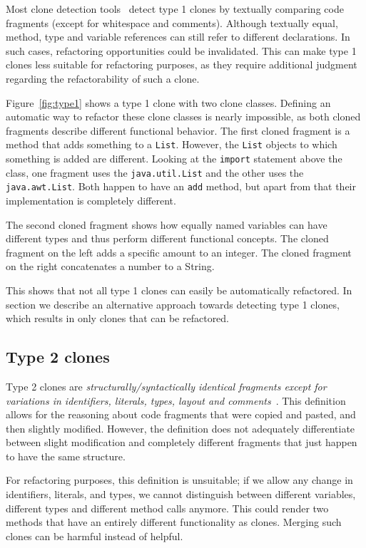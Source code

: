 Most clone detection tools~\cite{kamiya2002ccfinder, semura2017ccfindersw, roy2008nicad, svajlenko2016bigcloneeval, svajlenko2014evaluating} detect type 1 clones by textually comparing code fragments (except for whitespace and comments). Although textually equal, method, type and variable references can still refer to different declarations. In such cases, refactoring opportunities could be invalidated. This can make type 1 clones less suitable for refactoring purposes, as they require additional judgment regarding the refactorability of such a clone.

Figure~\ref{fig:type1} shows a type 1 clone with two clone classes. Defining an automatic way to refactor these clone classes is nearly impossible, as both cloned fragments describe different functional behavior. The first cloned fragment is a method that adds something to a \texttt{List}. However, the \texttt{List} objects to which something is added are different. Looking at the \texttt{import} statement above the class, one fragment uses the \texttt{java.util.List} and the other uses the \texttt{java.awt.List}. Both happen to have an \texttt{add} method, but apart from that their implementation is completely different.

The second cloned fragment shows how equally named variables can have different types and thus perform different functional concepts. The cloned fragment on the left adds a specific amount to an integer. The cloned fragment on the right concatenates a number to a String.

This shows that not all type 1 clones can easily be automatically refactored. In section \label{chap:type1rclones} we describe an alternative approach towards detecting type 1 clones, which results in only clones that can be refactored.

\subsection{Type 2 clones}\label{sec:type2}
Type 2 clones are \textit{structurally/syntactically identical fragments except for variations in identifiers, literals, types, layout and comments}~\cite{roy2007survey}. This definition allows for the reasoning about code fragments that were copied and pasted, and then slightly modified. However, the definition does not adequately differentiate between slight modification and completely different fragments that just happen to have the same structure.

For refactoring purposes, this definition is unsuitable; if we allow any change in identifiers, literals, and types, we cannot distinguish between different variables, different types and different method calls anymore. This could render two methods that have an entirely different functionality as clones. Merging such clones can be harmful instead of helpful.

